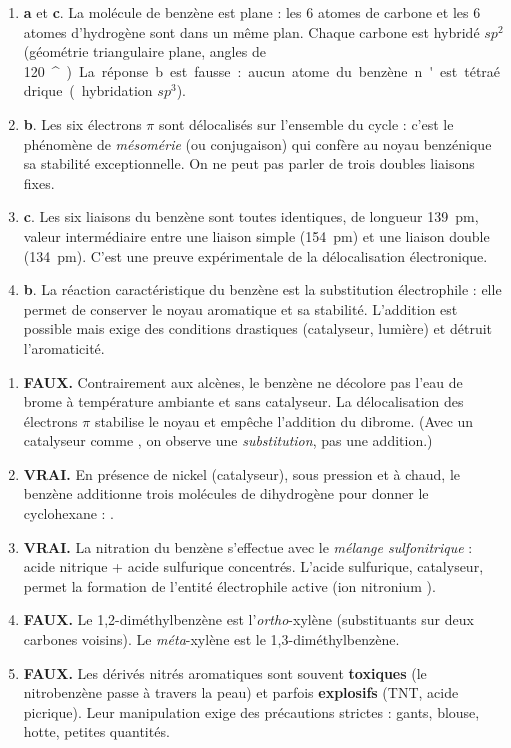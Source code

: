 \documentclass[11pt]{article}
\providecommand{\degree}{^{\circ}}
\newcommand{\cle}[1]{{\popxbold\color{popdark}#1}}
\begin{document}
\begin{corrige}
\begin{enumerate}
\item \textbf{a} et \textbf{c}. La molécule de benzène est \cle{plane} : les 6 atomes de carbone et les 6 atomes d'hydrogène sont dans un même plan. Chaque carbone est hybridé $sp^2$ (géométrie triangulaire plane, angles de \SI{120}{\degree}). La réponse b est fausse : aucun atome du benzène n'est tétraédrique (hybridation $sp^3$).
\item \textbf{b}. Les six électrons $\pi$ sont \cle{délocalisés} sur l'ensemble du cycle : c'est le phénomène de \emph{mésomérie} (ou conjugaison) qui confère au noyau benzénique sa stabilité exceptionnelle. On ne peut pas parler de trois doubles liaisons fixes.
\item \textbf{c}. Les six liaisons  du benzène sont toutes identiques, de longueur \SI{139}{pm}, valeur \cle{intermédiaire} entre une liaison simple (\SI{154}{pm}) et une liaison double (\SI{134}{pm}). C'est une preuve expérimentale de la délocalisation électronique.
\item \textbf{b}. La réaction caractéristique du benzène est la \cle{substitution} électrophile : elle permet de conserver le noyau aromatique et sa stabilité. L'addition est possible mais exige des conditions drastiques (catalyseur, lumière) et détruit l'aromaticité.
\end{enumerate}
\end{corrige}

\begin{corrige}
\begin{enumerate}
\item \textbf{FAUX.} Contrairement aux alcènes, le benzène ne décolore pas l'eau de brome à température ambiante et sans catalyseur. La délocalisation des électrons $\pi$ stabilise le noyau et empêche l'addition du dibrome. (Avec un catalyseur comme , on observe une \emph{substitution}, pas une addition.)
\item \textbf{VRAI.} En présence de nickel (catalyseur), sous pression et à chaud, le benzène additionne trois molécules de dihydrogène pour donner le cyclohexane : .
\item \textbf{VRAI.} La nitration du benzène s'effectue avec le \emph{mélange sulfonitrique} : acide nitrique + acide sulfurique concentrés. L'acide sulfurique, catalyseur, permet la formation de l'entité électrophile active (ion nitronium ).
\item \textbf{FAUX.} Le 1,2-diméthylbenzène est l'\emph{ortho}-xylène (substituants sur deux carbones voisins). Le \emph{méta}-xylène est le 1,3-diméthylbenzène.
\item \textbf{FAUX.} Les dérivés nitrés aromatiques sont souvent \textbf{toxiques} (le nitrobenzène passe à travers la peau) et parfois \textbf{explosifs} (TNT, acide picrique). Leur manipulation exige des précautions strictes : gants, blouse, hotte, petites quantités.
\end{enumerate}
\end{corrige}
\end{document}
